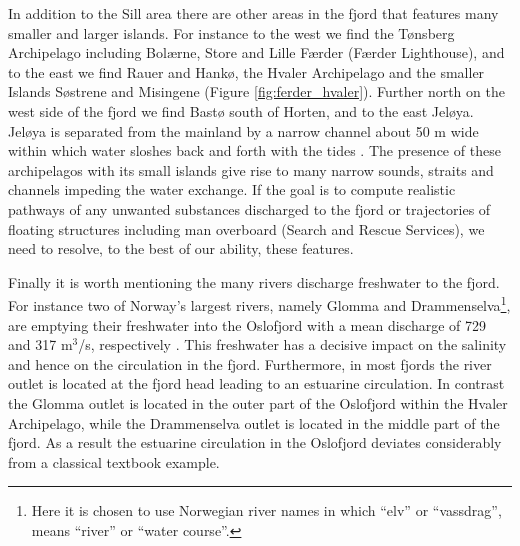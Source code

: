 In addition to the {\DR} Sill area there are other areas in the fjord that features many smaller and larger islands. For instance to the west we find the T{\o}nsberg Archipelago including Bol{\ae}rne, Store and Lille F{\ae}rder (F{\ae}rder Lighthouse), and to the east we find Rauer and Hank{\o}, the Hvaler Archipelago and the smaller Islands S{\o}strene and Misingene (Figure \ref{fig:ferder_hvaler}). Further north on the west side of the fjord we find Bast{\o} south of Horten, and to the east Jel{\o}ya. Jel{\o}ya is separated from the mainland by a narrow channel about 50 m wide within which water sloshes back and forth with the tides \citep{hjelm:etal:2014}. The presence of these archipelagos with its small islands give rise to many narrow sounds, straits and channels impeding the water exchange. If the goal is to compute realistic pathways of any unwanted substances discharged to the fjord or trajectories of floating structures including man overboard (Search and Rescue Services), we need to resolve, to the best of our ability, these features. 

Finally it is worth mentioning the many rivers discharge freshwater to the fjord. For instance two of Norway's largest rivers, namely Glomma and Drammenselva\footnote{Here it is chosen to use Norwegian river names in which ``elv'' or ``vassdrag'', means ``river'' or ``water course''.}, are emptying their freshwater into the Oslofjord with a mean discharge of 729 and 317 m$^3$/s, respectively \citep{milli:etal:2011}. This freshwater has a decisive impact on the salinity and hence on the circulation in the fjord. Furthermore, in most fjords the river outlet is located at the fjord head leading to an estuarine circulation. In contrast the Glomma outlet is located in the outer part of the Oslofjord within the Hvaler Archipelago, while the Drammenselva outlet is located in the middle part of the fjord. As a result the estuarine circulation in the Oslofjord deviates considerably from a classical textbook example.        


